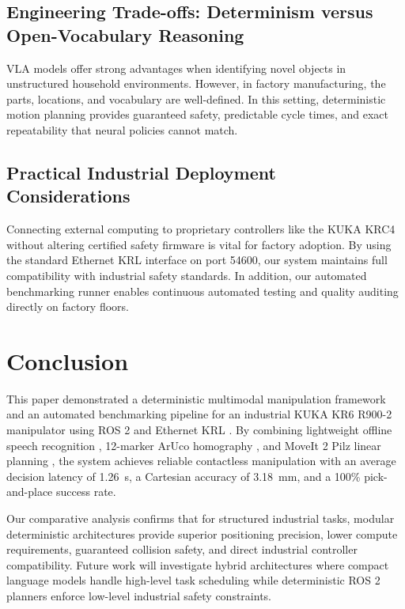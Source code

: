 \documentclass{svproc}
\begin{document}
\subsection{Engineering Trade-offs: Determinism versus Open-Vocabulary Reasoning}
VLA models offer strong advantages when identifying novel objects in unstructured household environments. However, in factory manufacturing, the parts, locations, and vocabulary are well-defined. In this setting, deterministic motion planning provides guaranteed safety, predictable cycle times, and exact repeatability that neural policies cannot match.

\subsection{Practical Industrial Deployment Considerations}
Connecting external computing to proprietary controllers like the KUKA KRC4 without altering certified safety firmware is vital for factory adoption. By using the standard Ethernet KRL interface on port 54600, our system maintains full compatibility with industrial safety standards. In addition, our automated benchmarking runner enables continuous automated testing and quality auditing directly on factory floors.

\FloatBarrier
\section{Conclusion}
\label{sec:conclusion}

This paper demonstrated a deterministic multimodal manipulation framework and an automated benchmarking pipeline for an industrial KUKA KR6 R900-2 manipulator using ROS 2 \cite{ros2_2022} and Ethernet KRL \cite{kuka_eki2019}. By combining lightweight offline speech recognition \cite{vosk2020}, 12-marker ArUco homography \cite{aruco2014}, and MoveIt 2 \cite{moveit2014} Pilz linear planning \cite{gasparetto2012}, the system achieves reliable contactless manipulation with an average decision latency of \SI{1.26}{\second}, a Cartesian accuracy of \SI{3.18}{\milli\meter}, and a 100\% pick-and-place success rate.

Our comparative analysis confirms that for structured industrial tasks, modular deterministic architectures provide superior positioning precision, lower compute requirements, guaranteed collision safety, and direct industrial controller compatibility. Future work will investigate hybrid architectures where compact language models handle high-level task scheduling while deterministic ROS 2 planners enforce low-level industrial safety constraints.
\end{document}
